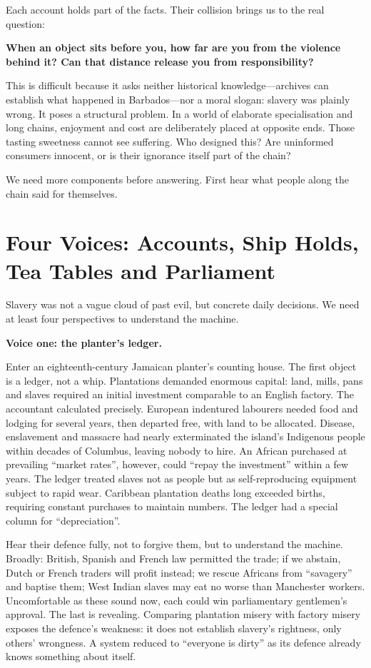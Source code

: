 Each account holds part of the facts. Their collision brings us to the real question:

\textbf{When an object sits before you, how far are you from the violence behind it? Can that distance release you from responsibility?}

This is difficult because it asks neither historical knowledge---archives can establish what happened in Barbados---nor a moral slogan: slavery was plainly wrong. It poses a structural problem. In a world of elaborate specialisation and long chains, enjoyment and cost are deliberately placed at opposite ends. Those tasting sweetness cannot see suffering. Who designed this? Are uninformed consumers innocent, or is their ignorance itself part of the chain?

We need more components before answering. First hear what people along the chain said for themselves.

\section[Four Voices along the Chain]{Four Voices: Accounts, Ship Holds, Tea Tables and Parliament}
Slavery was not a vague cloud of past evil, but concrete daily decisions. We need at least four perspectives to understand the machine.

\textbf{Voice one: the planter's ledger.}

Enter an eighteenth-century Jamaican planter's counting house. The first object is a ledger, not a whip. Plantations demanded enormous capital: land, mills, pans and slaves required an initial investment comparable to an English factory. The accountant calculated precisely. European indentured labourers needed food and lodging for several years, then departed free, with land to be allocated. Disease, enslavement and massacre had nearly exterminated the island's Indigenous people within decades of Columbus, leaving nobody to hire. An African purchased at prevailing ``market rates'', however, could ``repay the investment'' within a few years. The ledger treated slaves not as people but as self-reproducing equipment subject to rapid wear. Caribbean plantation deaths long exceeded births, requiring constant purchases to maintain numbers. The ledger had a special column for ``depreciation''.

Hear their defence fully, not to forgive them, but to understand the machine. Broadly: British, Spanish and French law permitted the trade; if we abstain, Dutch or French traders will profit instead; we rescue Africans from ``savagery'' and baptise them; West Indian slaves may eat no worse than Manchester workers. Uncomfortable as these sound now, each could win parliamentary gentlemen's approval. The last is revealing. Comparing plantation misery with factory misery exposes the defence's weakness: it does not establish slavery's rightness, only others' wrongness. A system reduced to ``everyone is dirty'' as its defence already knows something about itself.

